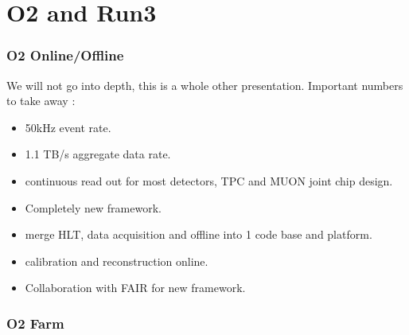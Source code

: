 \documentclass{beamer}
\begin{document}
\section{O2 and Run3}
\begin{frame}
\frametitle{O2 Online/Offline}
We will not go into depth, this is a whole other presentation.
Important numbers to take away :
\begin{itemize}
  \item 50kHz event rate.
  \item 1.1 TB/s aggregate data rate.
  \item continuous read out for most detectors, TPC and MUON joint chip design.
  \item Completely new framework.
  \item merge HLT, data acquisition and offline into 1 code base and platform.
  \item calibration and reconstruction online.
  \item Collaboration with FAIR for new framework.
\end{itemize}

\end{frame}
\begin{frame}
  \frametitle{O2 Farm}
\end{frame}
\end{document}
